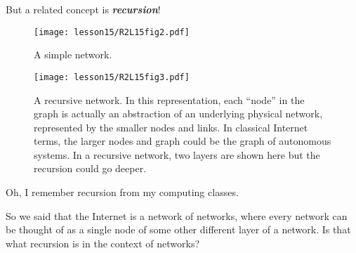 But a related concept is \textbf{\emph{recursion}}!


\begin{figure}[t]
    \centering
    \texttt{[image: lesson15/R2L15fig2.pdf]}
    \caption[A simple network.]{A simple network.}
    \label{fig:15-2-simple}
\end{figure}

\begin{figure}[t]
    \centering
    \texttt{[image: lesson15/R2L15fig3.pdf]}
    \caption[A recursive network.]{A recursive network. In this representation, each ``node'' in the graph is actually an abstraction of an underlying physical network, represented by the smaller nodes and links. In classical Internet terms, the larger nodes and graph could be the graph of autonomous systems. In a  recursive network, two layers are shown here but the recursion could go deeper.}
    \label{fig:15-3-recursive}
\end{figure}

\mmm Oh, I remember recursion from my computing classes.

So we said that the Internet is a network of networks, where every network can be thought of as a single node of some other different layer of a network. Is that what recursion is in the context of networks?

